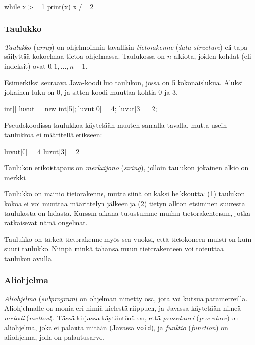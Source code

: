 \begin{code}
while x >= 1
    print(x)
    x /= 2
\end{code}

\subsubsection{Taulukko}


\emph{Taulukko} (\emph{array}) on ohjelmoinnin tavallisin \emph{tietorakenne}
(\emph{data structure})
eli tapa säilyttää kokoelmaa tietoa ohjelmassa.
Taulukossa on $n$ alkiota, joiden kohdat (eli indeksit) ovat $0,1,\dots,n-1$.

Esimerkiksi seuraava Java-koodi luo taulukon,
jossa on 5 kokonaislukua. Aluksi jokainen luku on 0,
ja sitten koodi muuttaa kohtia 0 ja 3.

\begin{code}
int[] luvut = new int[5];
luvut[0] = 4;
luvut[3] = 2;
\end{code}

Pseudokoodissa taulukkoa käytetään muuten samalla tavalla,
mutta usein taulukkoa ei määritellä erikseen:

\begin{code}
luvut[0] = 4
luvut[3] = 2
\end{code}

Taulukon erikoistapaus on \emph{merkkijono} (\emph{string}),
jolloin taulukon jokainen alkio on merkki.

Taulukko on mainio tietorakenne, mutta siinä on kaksi heikkoutta:
(1) taulukon kokoa ei voi muuttaa määrittelyn jälkeen ja
(2) tietyn alkion etsiminen suuresta taulukosta on hidasta.
Kurssin aikana tutustumme muihin tietorakenteisiin,
jotka ratkaisevat nämä ongelmat.

Taulukko on tärkeä tietorakenne myös sen vuoksi,
että tietokoneen muisti on kuin suuri taulukko.
Niinpä minkä tahansa muun tietorakenteen voi toteuttaa
taulukon avulla.

\subsubsection{Aliohjelma}


\emph{Aliohjelma} (\emph{subprogram}) on ohjelman nimetty osa,
jota voi kutsua parametreilla.
Aliohjelmalle on monia eri nimiä kielestä riippuen,
ja Javassa käytetään nimeä \emph{metodi} (\emph{method}).
Tässä kirjassa käytäntönä on,
että \emph{proseduuri} (\emph{procedure}) on aliohjelma,
joka ei palauta mitään (Javassa \texttt{void}),
ja \emph{funktio} (\emph{function}) on aliohjelma,
jolla on palautusarvo.


